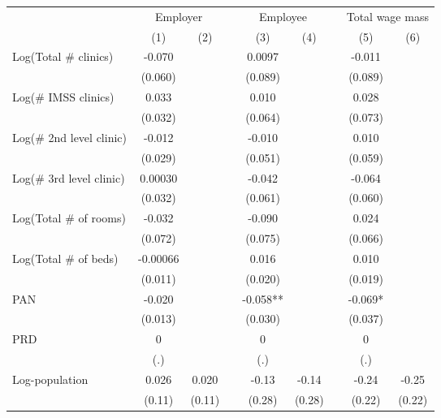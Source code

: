 \begin{tabular}{lcccccccc}
\toprule
      & \multicolumn{2}{c}{Employer} &       & \multicolumn{2}{c}{Employee} &       & \multicolumn{2}{c}{Total wage mass} \\
\cmidrule{2-3}\cmidrule{5-6}\cmidrule{8-9}      & (1)   & (2)   &       & (3)   & (4)   &       & (5)   & (6) \\
\midrule
\midrule
Log(Total \# clinics) & -0.070 &       &       & 0.0097 &       &       & -0.011 &  \\
      & (0.060) &       &       & (0.089) &       &       & (0.089) &  \\
Log(\# IMSS clinics) & 0.033 &       &       & 0.010 &       &       & 0.028 &  \\
      & (0.032) &       &       & (0.064) &       &       & (0.073) &  \\
Log(\# 2nd level clinic) & -0.012 &       &       & -0.010 &       &       & 0.010 &  \\
      & (0.029) &       &       & (0.051) &       &       & (0.059) &  \\
Log(\# 3rd level clinic) & 0.00030 &       &       & -0.042 &       &       & -0.064 &  \\
      & (0.032) &       &       & (0.061) &       &       & (0.060) &  \\
Log(Total \# of rooms) & -0.032 &       &       & -0.090 &       &       & 0.024 &  \\
      & (0.072) &       &       & (0.075) &       &       & (0.066) &  \\
Log(Total \# of beds) & -0.00066 &       &       & 0.016 &       &       & 0.010 &  \\
      & (0.011) &       &       & (0.020) &       &       & (0.019) &  \\
PAN   & -0.020 &       &       & -0.058** &       &       & -0.069* &  \\
      & (0.013) &       &       & (0.030) &       &       & (0.037) &  \\
PRD   & 0     &       &       & 0     &       &       & 0     &  \\
      & (.)   &       &       & (.)   &       &       & (.)   &  \\
\midrule
Log-population & 0.026 & 0.020 &       & -0.13 & -0.14 &       & -0.24 & -0.25 \\
      & (0.11) & (0.11) &       & (0.28) & (0.28) &       & (0.22) & (0.22) \\

\end{tabular}
